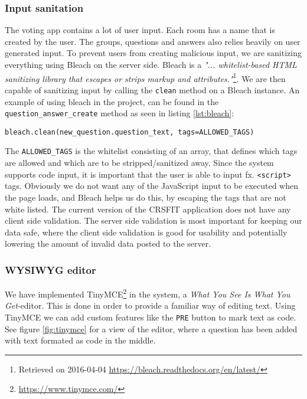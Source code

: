 \subsubsection*{Input sanitation}
The voting app contains a lot of user input. Each room has a name that is created by the user. The groups, questions and answers also relies heavily on user generated input. To prevent users from creating malicious input, we are sanitizing everything using Bleach on the server side. Bleach is a \emph{"... whitelist-based HTML sanitizing library that escapes or strips markup and attributes."}\footnote{Retrieved on 2016-04-04 \url{https://bleach.readthedocs.org/en/latest/}}. We are then capable of sanitizing input by calling the \texttt{clean} method on a Bleach instance. An example of using bleach in the project, can be found in the \texttt{question\_answer\_create} method as seen in listing \ref{lst:bleach}:

\begin{lstlisting}[caption=Using Bleach to sanitize input, label=lst:bleach]
bleach.clean(new_question.question_text, tags=ALLOWED_TAGS)
\end{lstlisting}

The \texttt{ALLOWED\_TAGS} is the whitelist consisting of an array, that defines which tags are allowed and which are to be stripped/sanitized away. Since the system supports code input, it is important that the user is able to input fx. \texttt{<script>} tags. Obviously we do not want any of the JavaScript input to be executed when the page loads, and Bleach helps us do this, by escaping the tags that are not white listed.
The current version of the CRSFIT application does not have any client side validation. The server side validation is most important for keeping our data safe, where the client side validation is good for usability and potentially lowering the amount of invalid data posted to the server.

\subsubsection*{WYSIWYG editor}
We have implemented TinyMCE\footnote{\url{https://www.tinymce.com/}} in the system, a \emph{What You See Is What You Get}-editor. This is done in order to provide a familiar way of editing text. Using TinyMCE we can add custom features like the \texttt{PRE} button to mark text as code. See figure \ref{fig:tinymce} for a view of the editor, where a question has been added with text formated as code in the middle.

